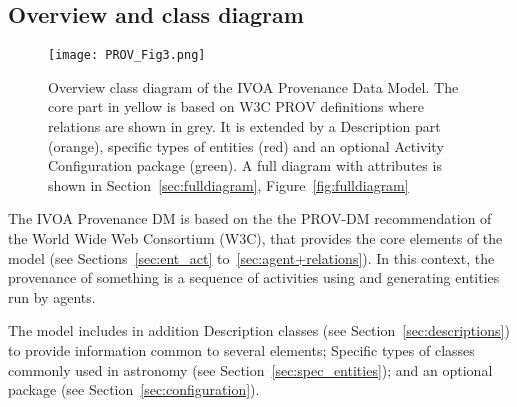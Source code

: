 

\subsection{Overview and class diagram}
\label{sec:overview}



\begin{figure}[hbt]
\centering
\texttt{[image: PROV\_Fig3.png]}
\caption[Overview class diagram of the IVOA Provenance Data Model]{Overview class diagram of the IVOA Provenance Data Model. The core part in yellow is based on W3C PROV definitions where relations are shown in grey. It is extended by a Description part (orange), specific types of entities (red) and an optional Activity Configuration package (green). A full diagram with attributes is shown in Section~\ref{sec:fulldiagram}, Figure~\ref{fig:fulldiagram}}
\label{fig:overview}
\end{figure}

The IVOA Provenance DM is based on the the PROV-DM recommendation \citep{std:W3CProvDM} of the World Wide Web Consortium (W3C), that provides the core elements of the model (see Sections~\ref{sec:ent_act} to~\ref{sec:agent+relations}). 
In this context, the provenance of something is a sequence of activities using and generating entities run by agents.

The model includes in addition Description classes (see Section~\ref{sec:descriptions}) to provide information common to several elements; Specific types of  classes commonly used in astronomy (see Section~\ref{sec:spec_entities}); and an optional  package (see Section~\ref{sec:configuration}).

